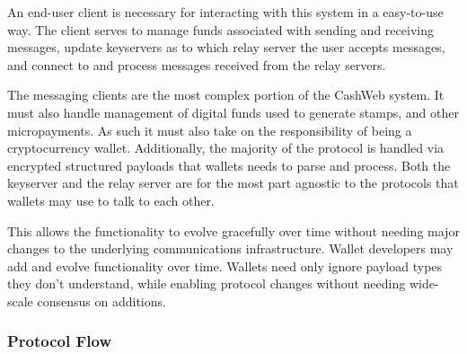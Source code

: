 \documentclass{article}
\begin{document}
An end-user client is necessary for interacting with this system in a easy-to-use way. The client serves to manage funds associated with sending and receiving messages, update keyservers as to which relay server the user accepts messages, and connect to and process messages received from the relay servers.

The messaging clients are the most complex portion of the CashWeb system. It must also handle management of digital funds used to generate stamps, and other micropayments. As such it must also take on the responsibility of being a cryptocurrency wallet. Additionally, the majority of the protocol is handled via encrypted structured payloads that wallets needs to parse and process. Both the keyserver and the relay server are for the most part agnostic to the protocols that wallets may use to talk to each other.

This allows the functionality to evolve gracefully over time without needing major changes to the underlying communications infrastructure. Wallet developers may add and evolve functionality over time. Wallets need only ignore payload types they don't understand, while enabling protocol changes without needing wide-scale consensus on additions.

\subsubsection{Protocol Flow}

\begin{figure}[H]
  \begin{center}
  \end{center}
\end{figure}
\end{document}
